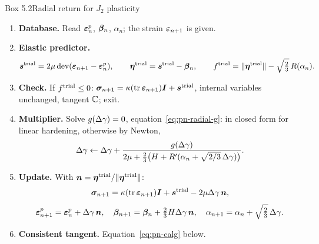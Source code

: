 \begin{gbox}{Box 5.2\quad Radial return for \texorpdfstring{$J_2$}{J2} plasticity}
%
\begin{enumerate}[label=\textbf{\arabic*.},leftmargin=1.6em]
  \item \textbf{Database.} Read $\bm{\varepsilon}^{p}_n$, $\bm{\beta}_n$, $\alpha_n$; the strain
  $\bm{\varepsilon}_{n+1}$ is given.
  \item \textbf{Elastic predictor.}
  \[
    \bm{s}^{\mathrm{trial}}=2\mu\operatorname{dev}(\bm{\varepsilon}_{n+1}-\bm{\varepsilon}^{p}_n),\qquad
    \bm{\eta}^{\mathrm{trial}}=\bm{s}^{\mathrm{trial}}-\bm{\beta}_n,\qquad
    f^{\mathrm{trial}}=\lVert \bm{\eta}^{\mathrm{trial}}\rVert-\sqrt{\tfrac23}\,R(\alpha_n).
  \]
  \item \textbf{Check.} If $f^{\mathrm{trial}}\le0$: $\bm{\sigma}_{n+1}=\kappa(\operatorname{tr}\bm{\varepsilon}_{n+1})\bm{I}+\bm{s}^{\mathrm{trial}}$,
  internal variables unchanged, tangent $\mathbb{C}$; exit.
  \item \textbf{Multiplier.} Solve $g(\Delta\gamma)=0$, equation~\eqref{eq:pn-radial-g}:
  in closed form for linear hardening, otherwise by Newton,
  \[
    \Delta\gamma\leftarrow\Delta\gamma+\frac{g(\Delta\gamma)}{2\mu+\tfrac23\bigl(H+R'(\alpha_n+\sqrt{2/3}\,\Delta\gamma)\bigr)} .
  \]
  \item \textbf{Update.} With $\bm{n}=\bm{\eta}^{\mathrm{trial}}/\lVert \bm{\eta}^{\mathrm{trial}}\rVert$:
  \[
    \bm{\sigma}_{n+1}=\kappa(\operatorname{tr}\bm{\varepsilon}_{n+1})\bm{I}+\bm{s}^{\mathrm{trial}}-2\mu\Delta\gamma\,\bm{n},
  \]
  \[
    \bm{\varepsilon}^{p}_{n+1}=\bm{\varepsilon}^{p}_n+\Delta\gamma\,\bm{n},\quad
    \bm{\beta}_{n+1}=\bm{\beta}_n+\tfrac23H\Delta\gamma\,\bm{n},\quad
    \alpha_{n+1}=\alpha_n+\sqrt{\tfrac23}\,\Delta\gamma .
  \]
  \item \textbf{Consistent tangent.} Equation~\eqref{eq:pn-calg} below.
\end{enumerate}
\end{gbox}

